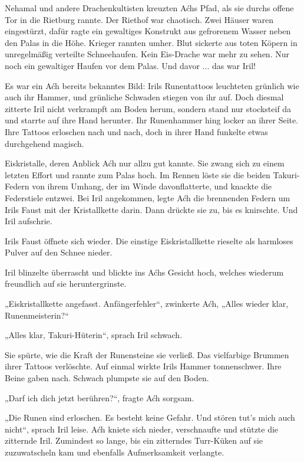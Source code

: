 Nehamal und andere Drachenkultisten kreuzten Aćhs Pfad, als sie durchs offene Tor in die Rietburg rannte. Der Riethof war chaotisch. Zwei Häuser waren eingestürzt, dafür ragte ein gewaltiges Konstrukt aus gefrorenem Wasser neben den Palas in die Höhe. Krieger rannten umher. Blut sickerte aus toten Köpern in unregelmäßig verteilte Schneehaufen. Kein Eis-Drache war mehr zu sehen. Nur noch ein gewaltiger Haufen vor dem Palas. Und davor ... das war Iril!

Es war ein Aćh bereits bekanntes Bild: Irils Runentattoos leuchteten grünlich wie auch ihr Hammer, und grünliche Schwaden stiegen von ihr auf. Doch diesmal zitterte Iril nicht verkrampft am Boden herum, sondern stand nur stocksteif da und starrte auf ihre Hand herunter. Ihr Runenhammer hing locker an ihrer Seite. Ihre Tattoos erloschen nach und nach, doch in ihrer Hand funkelte etwas durchgehend magisch.

Eiskristalle, deren Anblick Aćh nur allzu gut kannte. Sie zwang sich zu einem letzten Effort und rannte zum Palas hoch. Im Rennen löste sie die beiden Takuri-Federn von ihrem Umhang, der im Winde davonflatterte, und knackte die Federstiele entzwei. Bei Iril angekommen, legte Aćh die brennenden Federn um Irils Faust mit der Kristallkette darin. Dann drückte sie zu, bis es knirschte. Und Iril aufschrie.

Irils Faust öffnete sich wieder. Die einstige Eiskristallkette rieselte als harmloses Pulver auf den Schnee nieder.

Iril blinzelte überrascht und blickte ins Aćhs Gesicht hoch, welches wiederum freundlich auf sie heruntergrinste.

„Eiskristallkette angefasst. Anfängerfehler“, zwinkerte Aćh, „Alles wieder klar, Runenmeisterin?“

„Alles klar, Takuri-Hüterin“, sprach Iril schwach.

Sie spürte, wie die Kraft der Runensteine sie verließ. Das vielfarbige Brummen ihrer Tattoos verlöschte. Auf einmal wirkte Irils Hammer tonnenschwer. Ihre Beine gaben nach. Schwach plumpste sie auf den Boden.

„Darf ich dich jetzt berühren?“, fragte Aćh sorgsam.

„Die Runen sind erloschen. Es besteht keine Gefahr. Und stören tut’s mich auch nicht“, sprach Iril leise. Aćh kniete sich nieder, verschnaufte und stützte die zitternde Iril. Zumindest so lange, bis ein zitterndes Turr-Küken auf sie zuzuwatscheln kam und ebenfalls Aufmerksamkeit verlangte.

